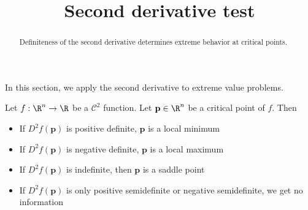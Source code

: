 \documentclass{ximera}
\title{Second derivative test}
\begin{document}
	\begin{abstract}
		Definiteness of the second derivative determines extreme behavior at critical points.
	\end{abstract}\maketitle
	
	In this section, we apply the second derivative to extreme value problems.
	
	\begin{theorem}
		Let $f:\R^n \to \R$ be a $\mathcal{C}^2$ function.  Let $\mathbf{p} \in \R^n$ be a critical point of $f$.  Then 
			\begin{itemize}
				\item If $D^2f(\mathbf{p})$ is positive definite, $\mathbf{p}$ is a local minimum
				\item If $D^2f(\mathbf{p})$ is negative definite, $\mathbf{p}$ is a local maximum
				\item If $D^2f(\mathbf{p})$ is indefinite, then $\mathbf{p}$ is a saddle point
				\item If $D^2f(\mathbf{p})$ is only positive semidefinite or negative semidefinite, we get no information
			\end{itemize}
	\end{theorem}
	
\end{document}
